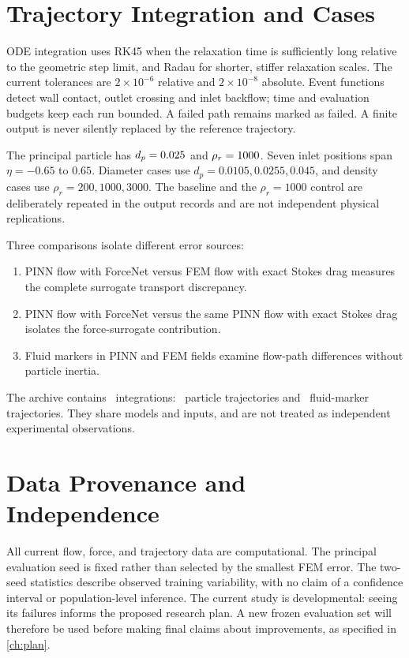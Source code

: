 \section{Trajectory Integration and Cases}
ODE integration uses RK45 when the relaxation time is sufficiently long
relative to the geometric step limit, and Radau for shorter, stiffer
relaxation scales. The current tolerances are $2\times10^{-6}$ relative and
$2\times10^{-8}$ absolute. Event functions detect wall contact, outlet
crossing and inlet backflow; time and evaluation budgets keep each run
bounded. A failed path remains marked as failed. A finite output is never
silently replaced by the reference trajectory.

The principal particle has $d_p=0.025$ and
$\rho_r=1000$. Seven inlet positions span $\eta=-0.65$ to
$0.65$. Diameter cases use $d_p=0.0105,0.0255,0.045$, and density cases use
$\rho_r=200,1000,3000$. The baseline and the $\rho_r=1000$ control are
deliberately repeated in the output records and are not independent
physical replications.

Three comparisons isolate different error sources:
\begin{enumerate}
\item PINN flow with ForceNet versus FEM flow with exact Stokes drag measures
the complete surrogate transport discrepancy.
\item PINN flow with ForceNet versus the same PINN flow with exact Stokes
drag isolates the force-surrogate contribution.
\item Fluid markers in PINN and FEM fields examine flow-path differences
without particle inertia.
\end{enumerate}
The archive contains \TotalIntegrations\ integrations:
\ParticleIntegrations\ particle trajectories and \TracerIntegrations\
fluid-marker trajectories. They share models and inputs, and are not treated
as independent experimental observations.

\section{Data Provenance and Independence}
All current flow, force, and trajectory data are computational. The principal
evaluation seed is fixed rather than selected by the smallest FEM error.
The two-seed statistics describe observed training variability, with no claim
of a confidence interval or population-level inference. The current study
is developmental: seeing its failures informs the proposed research plan.
A new frozen evaluation set will therefore be used before making final
claims about improvements, as specified in \cref{ch:plan}.
